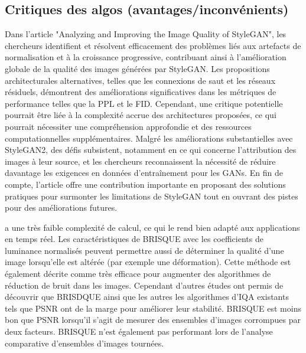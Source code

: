 \documentclass{ieeeaccess}
\begin{document}
\subsection{Critiques des algos (avantages/inconvénients)}

 Dans l'article "Analyzing and Improving the Image Quality of StyleGAN", les chercheurs identifient et résolvent efficacement des problèmes liés aux artefacts de normalisation et à la croissance progressive, contribuant ainsi à l'amélioration globale de la qualité des images générées par StyleGAN. Les propositions architecturales alternatives, telles que les connexions de saut et les réseaux résiduels, démontrent des améliorations significatives dans les métriques de performance telles que la PPL et le FID. Cependant, une critique potentielle pourrait être liée à la complexité accrue des architectures proposées, ce qui pourrait nécessiter une compréhension approfondie et des ressources computationnelles supplémentaires. Malgré les améliorations substantielles avec StyleGAN2, des défis subsistent, notamment en ce qui concerne l'attribution des images à leur source, et les chercheurs reconnaissent la nécessité de réduire davantage les exigences en données d'entraînement pour les GANs. En fin de compte, l'article offre une contribution importante en proposant des solutions pratiques pour surmonter les limitations de StyleGAN tout en ouvrant des pistes pour des améliorations futures. 

 a une très faible complexité de calcul, ce qui le rend bien adapté aux applications en temps réel. Les caractéristiques de BRISQUE avec les coefficients de luminance normalisés peuvent permettre aussi de déterminer la qualité d’une image lorsqu’elle est altérée (par exemple une déformation). Cette méthode est également décrite comme très efficace pour augmenter des algorithmes de réduction de bruit dans les images. Cependant d’autres études ont permis de découvrir que BRISDQUE ainsi que les autres les algorithmes d’IQA existants tels que PSNR ont de la marge pour améliorer leur stabilité. BRISQUE est moins bon que PSNR lorsqu'il s'agit de mesurer des ensembles d'images corrompues par deux facteurs. BRISQUE n’est également pas performant lors de l'analyse comparative d'ensembles d'images tournées. 
\end{document}
